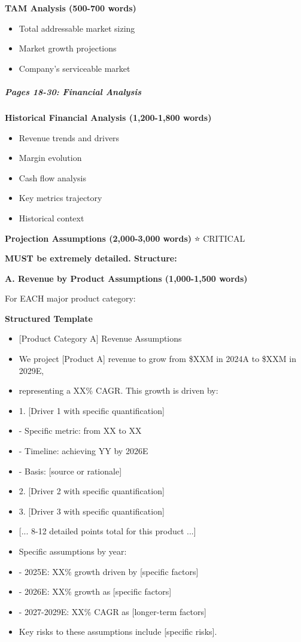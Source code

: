 \documentclass[11pt]{article}
\begin{document}
\textbf{TAM Analysis (500-700 words)}

\begin{itemize}[leftmargin=*,itemsep=2pt,topsep=2pt]
\item {} Total addressable market sizing
\item {} Market growth projections
\item {} Company's serviceable market
\end{itemize}

\subparagraph{Pages 18-30: Financial Analysis}\mbox{}\par

\textbf{Historical Financial Analysis (1,200-1,800 words)}

\begin{itemize}[leftmargin=*,itemsep=2pt,topsep=2pt]
\item {} Revenue trends and drivers
\item {} Margin evolution
\item {} Cash flow analysis
\item {} Key metrics trajectory
\item {} Historical context
\end{itemize}

\textbf{Projection Assumptions (2,000-3,000 words)} ⭐ CRITICAL


\textbf{MUST be extremely detailed. Structure:}


\textbf{A. Revenue by Product Assumptions (1,000-1,500 words)}


For EACH major product category:

\textbf{Structured Template}
\begin{itemize}[leftmargin=*,itemsep=2pt,topsep=2pt]
\item {} [Product Category A] Revenue Assumptions
\item {} We project [Product A] revenue to grow from \$XXM in 2024A to \$XXM in 2029E,
\item {} representing a XX\% CAGR. This growth is driven by:
\item {} 1. [Driver 1 with specific quantification]
\item {} - Specific metric: from XX to XX
\item {} - Timeline: achieving YY by 2026E
\item {} - Basis: [source or rationale]
\item {} 2. [Driver 2 with specific quantification]
\item {} 3. [Driver 3 with specific quantification]
\item {} [... 8-12 detailed points total for this product ...]
\item {} Specific assumptions by year:
\item {} - 2025E: XX\% growth driven by [specific factors]
\item {} - 2026E: XX\% growth as [specific factors]
\item {} - 2027-2029E: XX\% CAGR as [longer-term factors]
\item {} Key risks to these assumptions include [specific risks].
\end{itemize}
\end{document}
